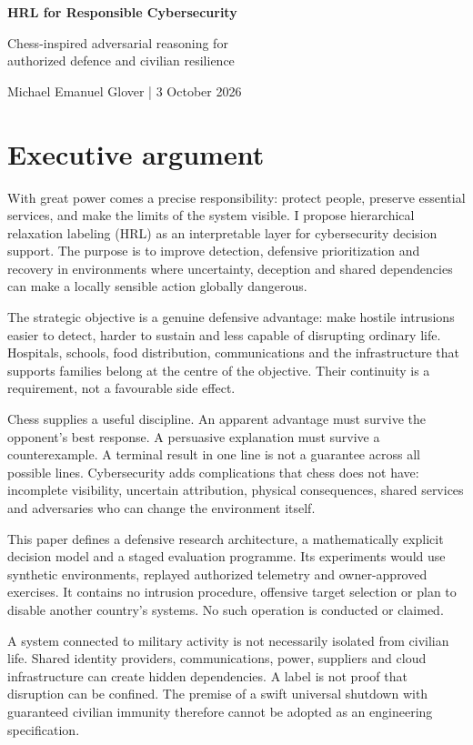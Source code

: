 \documentclass[11pt]{article}
\begin{document}
\begin{center}
{\LARGE\bfseries\color{ink}HRL for Responsible Cybersecurity}\par\vspace{10pt}
{\large\color{blue}Chess-inspired adversarial reasoning for\\authorized defence and civilian resilience}\par\vspace{10pt}
Michael Emanuel Glover | 3 October 2026
\end{center}

\section*{Executive argument}
With great power comes a precise responsibility: protect people, preserve essential services, and make the limits of the system visible. I propose hierarchical relaxation labeling (HRL) as an interpretable layer for cybersecurity decision support. The purpose is to improve detection, defensive prioritization and recovery in environments where uncertainty, deception and shared dependencies can make a locally sensible action globally dangerous.

The strategic objective is a genuine defensive advantage: make hostile intrusions easier to detect, harder to sustain and less capable of disrupting ordinary life. Hospitals, schools, food distribution, communications and the infrastructure that supports families belong at the centre of the objective. Their continuity is a requirement, not a favourable side effect.

Chess supplies a useful discipline. An apparent advantage must survive the opponent's best response. A persuasive explanation must survive a counterexample. A terminal result in one line is not a guarantee across all possible lines. Cybersecurity adds complications that chess does not have: incomplete visibility, uncertain attribution, physical consequences, shared services and adversaries who can change the environment itself.

This paper defines a defensive research architecture, a mathematically explicit decision model and a staged evaluation programme. Its experiments would use synthetic environments, replayed authorized telemetry and owner-approved exercises. It contains no intrusion procedure, offensive target selection or plan to disable another country's systems. No such operation is conducted or claimed.

A system connected to military activity is not necessarily isolated from civilian life. Shared identity providers, communications, power, suppliers and cloud infrastructure can create hidden dependencies. A label is not proof that disruption can be confined. The premise of a swift universal shutdown with guaranteed civilian immunity therefore cannot be adopted as an engineering specification.
\end{document}
